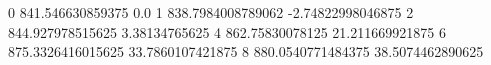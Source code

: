 0 841.546630859375 0.0
1 838.7984008789062 -2.74822998046875
2 844.927978515625 3.38134765625
4 862.75830078125 21.211669921875
6 875.3326416015625 33.7860107421875
8 880.0540771484375 38.5074462890625
